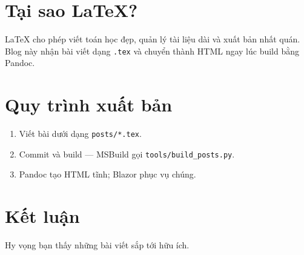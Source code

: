 \section{Tại sao LaTeX?}

LaTeX cho phép viết toán học đẹp, quản lý tài liệu dài và xuất bản
nhất quán. Blog này nhận bài viết dạng \texttt{.tex} và chuyển thành
HTML ngay lúc build bằng Pandoc.

\section{Quy trình xuất bản}

\begin{enumerate}
\item Viết bài dưới dạng \texttt{posts/*.tex}.
\item Commit và build --- MSBuild gọi \texttt{tools/build\_posts.py}.
\item Pandoc tạo HTML tĩnh; Blazor phục vụ chúng.
\end{enumerate}

\section{Kết luận}

Hy vọng bạn thấy những bài viết sắp tới hữu ích.
